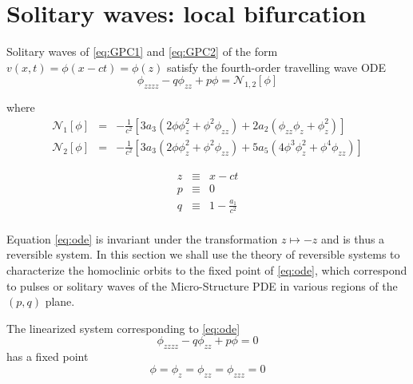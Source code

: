 \section{Solitary waves: local bifurcation}

Solitary waves of \eqref{eq:GPC1} and \eqref{eq:GPC2} of the form 
$v(x,t) = \phi\left(x - c t\right) = \phi\left(z\right)$
 satisfy the fourth-order travelling wave ODE
\begin{equation} \label{eq:ode} \phi_{zzzz} - q \phi_{zz} + p \phi = \mathcal{N}_{1,2}[\phi]
\end{equation}

where 
\begin{subequations}
\begin{eqnarray}
\mathcal{N}_1\left[\phi\right] &=& - \frac{1}{c^2}\left[  3 a_3 \left( 2 \phi \phi_z^2 + \phi^2 \phi_{zz} \right) + 2 a_2\left( \phi_{zz} \phi_z + \phi_z^2\right) \right] \\
\mathcal{N}_2\left[\phi\right] &=& - \frac{1}{c^2}\left[ 3 a_3 \left( 2 \phi \phi_z^2 + \phi^2 \phi_{zz}\right) + 5 a_5 \left( 4 \phi^3 \phi_z^2 + \phi^4 \phi_{zz} \right) \right]
\end{eqnarray}
\end{subequations}

\begin{subequations}
\begin{eqnarray}
z &\equiv& x - c t\\
p &\equiv& 0\label{eq:pdef} \\
q &\equiv & 1 - \frac{a_1}{c^2} \label{eq:qdef} \\
\end{eqnarray}
\end{subequations}

Equation \eqref{eq:ode} is invariant under the transformation $ z \mapsto -z $ and is thus a reversible system. In this section we shall
use the theory of reversible systems to characterize the homoclinic orbits to the fixed point of \eqref{eq:ode}, which correspond to pulses
or solitary waves of the Micro-Structure PDE in various regions of the $(p,q)$ plane.

The linearized system corresponding to \eqref{eq:ode}
\begin{equation}
 \label{eq:linode} \phi_{zzzz} - q \phi_{zz} + p \phi = 0
\end{equation}
has a fixed point \begin{equation}\label{eq:fp} \phi = \phi_z = \phi_{zz} = \phi_{zzz} = 0 \end{equation}

